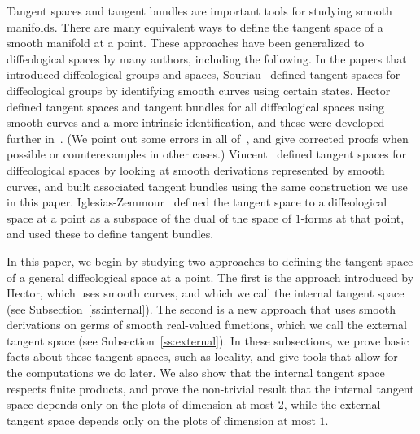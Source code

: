 \documentclass[12pt]{amsart}
\theoremstyle{remark}
\begin{document}
Tangent spaces and tangent bundles are important tools for studying
smooth manifolds.
There are many equivalent ways to define the tangent space of a smooth manifold
at a point.
These approaches have been generalized to diffeological spaces by many
authors, including the following.
In the papers that introduced diffeological groups and spaces,
Souriau~\cite{So1,So2} defined tangent spaces for diffeological groups
by identifying smooth curves using certain states.
Hector~\cite{He} defined tangent spaces and tangent bundles for all diffeological
spaces using smooth curves and a more intrinsic identification,
and these were developed further in~\cite{HM,La}.
(We point out some errors in all of~\cite{He,HM,La}, and give
corrected proofs when possible or counterexamples in other cases.)
%
%
%
%
%
%
%
%
%
%
%
%
%
%
%
%
%
%
%
%
%
%
Vincent~\cite{V} defined tangent spaces for diffeological spaces
by looking at smooth derivations represented by smooth curves,
and built associated tangent bundles using the same construction we use
in this paper.
Iglesias-Zemmour~\cite[6.53]{I3} defined the tangent space to a
diffeological space at a point as a subspace of the dual of the
space of $1$-forms at that point, and used these to define tangent bundles.
%
%

In this paper, we begin by studying two approaches to defining
the tangent space of a general diffeological space at a point.
The first is the approach introduced by Hector, which uses smooth curves,
and which we call the internal tangent space (see Subsection~\ref{ss:internal}).
The second is a new approach that uses smooth derivations on germs of smooth real-valued functions,
which we call the external tangent space (see Subsection~\ref{ss:external}).
%
In these subsections, we prove basic facts about these tangent spaces, such as locality,
and give tools that allow for the computations we do later.
We also show that the internal tangent space respects finite products,
and prove the non-trivial result that the internal tangent space
depends only on the plots of dimension at most $2$,
while the external tangent space depends only on the plots of dimension at most $1$.
%
%
\end{document}
